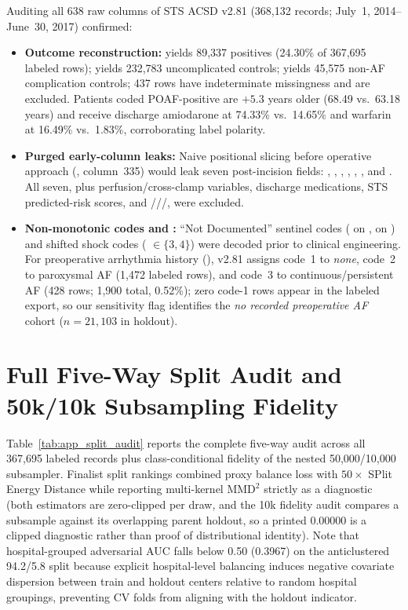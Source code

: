 Auditing all 638 raw columns of STS ACSD v2.81 (368,132 records; July~1, 2014--June~30, 2017) confirmed:
\begin{itemize}[itemsep=1pt,topsep=2pt]
  \item \textbf{Outcome reconstruction:}  yields 89,337 positives (24.30\% of 367,695 labeled rows);  yields 232,783 uncomplicated controls;  yields 45,575 non-AF complication controls; 437 rows have indeterminate missingness and are excluded. Patients coded POAF-positive are $+5.3$ years older (68.49 vs.\ 63.18 years) and receive discharge amiodarone at 74.33\% vs.\ 14.65\% and warfarin at 16.49\% vs.\ 1.83\%, corroborating label polarity.
  \item \textbf{Purged early-column leaks:} Naive positional slicing before operative approach (, column~335) would leak seven post-incision fields: , , , , , , and . All seven, plus perfusion/cross-clamp variables, discharge medications, STS predicted-risk scores, and ///, were excluded.
  \item \textbf{Non-monotonic codes and :} ``Not Documented'' sentinel codes ( on ,  on ) and shifted shock codes ( $\in \{3,4\}$) were decoded prior to clinical engineering. For preoperative arrhythmia history (), v2.81 assigns code~1 to \emph{none}, code~2 to paroxysmal AF (1,472 labeled rows), and code~3 to continuous/persistent AF (428 rows; 1,900 total, 0.52\%); zero code-1 rows appear in the labeled export, so our sensitivity flag identifies the \emph{no recorded preoperative AF} cohort ($n=21{,}103$ in holdout).
\end{itemize}

\section{Full Five-Way Split Audit and 50k/10k Subsampling Fidelity}
\label{app:splits}

Table~\ref{tab:app_split_audit} reports the complete five-way audit across all 367,695 labeled records plus class-conditional fidelity of the nested 50,000/10,000 subsampler. Finalist split rankings combined proxy balance loss with $50\times$ SPlit Energy Distance while reporting multi-kernel $\mathrm{MMD}^2$ strictly as a diagnostic (both estimators are zero-clipped per draw, and the 10k fidelity audit compares a subsample against its overlapping parent holdout, so a printed 0.00000 is a clipped diagnostic rather than proof of distributional identity). Note that hospital-grouped adversarial AUC falls below 0.50 (0.3967) on the anticlustered 94.2/5.8 split because explicit hospital-level balancing induces negative covariate dispersion between train and holdout centers relative to random hospital groupings, preventing CV folds from aligning with the holdout indicator.

